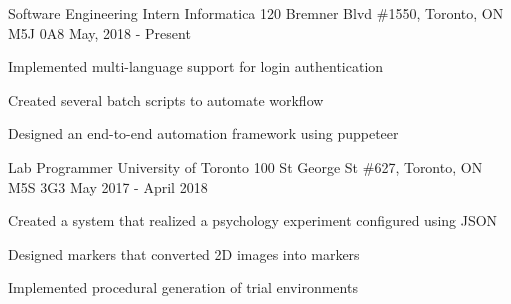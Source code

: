 





\begin{cventries}



\cventry
{Software Engineering Intern} %
{Informatica} %
{120 Bremner Blvd \#1550, Toronto, ON M5J 0A8} %
{May, 2018 - Present} %
{ %
	\begin{cvitems}
		\item {Implemented multi-language support for login authentication}
		\item {Created several batch scripts to automate workflow}
		\item {Designed an end-to-end automation framework using puppeteer}
	\end{cvitems}
}



\cventry
{Lab Programmer} %
{University of Toronto} %
{100 St George St \#627, Toronto, ON M5S 3G3} %
{May 2017 - April 2018} %
{ %
	\begin{cvitems}
		\item {Created a system that realized a psychology experiment configured using JSON}
		\item {Designed markers that converted 2D images into markers}
		\item {Implemented procedural generation of trial environments}
	\end{cvitems}
}



\end{cventries}